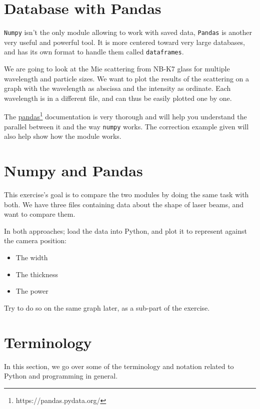 \documentclass[twocolumn]{article}
\begin{document}
\section{Database with Pandas}\label{sec:database_pandas}

\verb|Numpy| isn't the only module allowing to work with saved data, \verb|Pandas| is another very useful and powerful tool. It is more centered toward very large databases, and has its own format to handle them called \verb|dataframes|.

We are going to look at the Mie scattering from NB-K7 glass for multiple wavelength and particle sizes. We want to plot the results of the scattering on a graph with the wavelength as abscissa and the intensity as ordinate. Each wavelength is in a different file, and can thus be easily plotted one by one.

The \href{https://pandas.pydata.org/}{pandas}\footnote{https://pandas.pydata.org/} documentation is very thorough and will help you understand the parallel between it and the way \verb|numpy| works. The correction example given will also help show how the module works.

\section{Numpy and Pandas}\label{sec:numpy_and_pandas}

This exercise's goal is to compare the two modules by doing the same task with both. We have three files containing data about the shape of laser beams, and want to compare them.

In both approaches; load the data into Python, and plot it to represent against the camera position:

\begin{itemize}
    \item The width
    \item The thickness
    \item The power
\end{itemize}

Try to do so on the same graph later, as a sub-part of the exercise.

\newpage
\appendix

\section{Terminology}\label{app:tarminology}

In this section, we go over some of the terminology and notation related to Python and programming in general.
\end{document}
